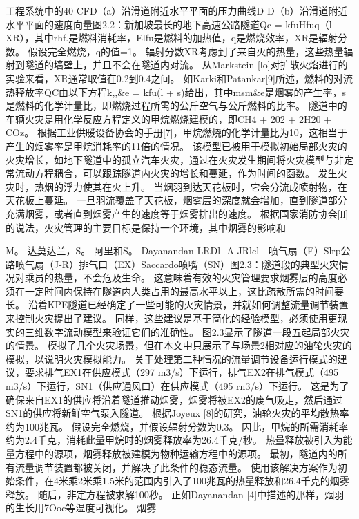 \documentclass[UTF8,11pt,a4paper,openany,fontset=fandol]{ctexbook}
\begin{document}
工程系统中的40 CFD（a）沿滑道附近水平平面的压力曲线D D（b）沿滑道附近水平平面的速度向量图2.2：新加坡最长的地下高速公路隧道Qc = kfuHfuq（l - XR），其中rhf.是燃料消耗率，Elfu是燃料的加热值，q是燃烧效率，XR是辐射分数。 假设完全燃烧，q的值=1。 辐射分数XR考虑到了来自火的热量，这些热量辐射到隧道的墙壁上，并且不会在隧道内对流。 从Markstein [lo]对扩散火焰进行的实验来看，XR通常取值在0.2到0.4之间。 如Karki和Patankar[9]所述，燃料的对流热释放率QC由以下方程k,,\&e = kfu(l + s)给出，其中msm\&e是烟雾的产生率，s是燃料的化学计量比，即燃烧过程所需的公斤空气与公斤燃料的比率。 隧道中的车辆火灾是用化学反应方程定义的甲烷燃烧建模的，即CH4 + 202 + 2H20 + COz。 根据工业供暖设备协会的手册[7]，甲烷燃烧的化学计量比为10，这相当于产生的烟雾率是甲烷消耗率的11倍的情况。 该模型已被用于模拟初始局部火灾的火灾增长，如地下隧道中的孤立汽车火灾，通过在火灾发生期间将火灾模型与非定常流动方程耦合，可以跟踪隧道内火灾的增长和蔓延，作为时间的函数。 发生火灾时，热烟的浮力使其在火上升。 当烟羽到达天花板时，它会分流成喷射物，在天花板上蔓延。 一旦羽流覆盖了天花板，烟雾层的深度就会增加，直到隧道部分充满烟雾，或者直到烟雾产生的速度等于烟雾排出的速度。 根据国家消防协会[ll]的说法，火灾管理的主要目标是保持一个环境，其中烟雾的影响和

M。 达莫达兰，S。 阿里和S。 Dayanandan LRDl -A JRlcl - 喷气扇（E）Slrp公路喷气扇（J-R）排气口（EX）Saccardo喷嘴（SN）图2.3：隧道段的典型火灾情况对乘员的热量，不会危及生命。 这意味着有效的火灾管理要求烟雾层的高度必须在一定时间内保持在隧道内人类占用的最高水平以上，这比疏散所需的时间要长。 沿着KPE隧道已经确定了一些可能的火灾情景，并就如何调整流量调节装置来控制火灾提出了建议。 同样，这些建议是基于简化的经验模型，必须使用更现实的三维数字流动模型来验证它们的准确性。 图2.3显示了隧道一段五起局部火灾的情景。 模拟了几个火灾场景，但在本文中只展示了与场景2相对应的油轮火灾的模拟，以说明火灾模拟能力。 关于处理第二种情况的流量调节设备运行模式的建议，要求排气EX1在供应模式（297 m3/s）下运行，排气EX2在排气模式（495 m3/s）下运行，SN1（供应通风口）在供应模式（495 rn3/s）下运行。 这是为了确保来自EX1的供应将沿着隧道推动烟雾，烟雾将被EX2的废气吸走，然后通过SN1的供应将新鲜空气泵入隧道。 根据Joyeux [8]的研究，油轮火灾的平均散热率约为100兆瓦。 假设完全燃烧，并假设辐射分数为0.3。 因此，甲烷的所需消耗率约为2.4千克，消耗此量甲烷时的烟雾释放率为26.4千克/秒。 热量释放被引入为能量方程中的源项，烟雾释放被建模为物种运输方程中的源项。 最初，隧道内的所有流量调节装置都被关闭，并解决了此条件的稳态流量。 使用该解决方案作为初始条件，在4米乘2米乘1.5米的范围内引入了100兆瓦的热量释放和26.4千克的烟雾释放。 随后，非定方程被求解100秒。 正如Dayanandan [4]中描述的那样，烟羽的生长用7Ooc等温度可视化。 烟雾
\end{document}
